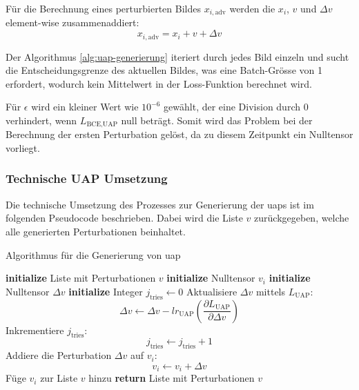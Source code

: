 Für die Berechnung eines perturbierten Bildes $x_{i,\text{adv}}$ werden die $x_i$, $v$ und $\Delta v$ element-wise zusammenaddiert: 
$$x_{i,\text{adv}} = x_i + v + \Delta v$$

Der Algorithmus \ref{alg:uap-generierung} iteriert durch jedes Bild einzeln und sucht die Entscheidungsgrenze des aktuellen Bildes, was eine Batch-Grösse von 1 erfordert, wodurch kein Mittelwert in der Loss-Funktion berechnet wird.

Für $\epsilon$ wird ein kleiner Wert wie $10^{-6}$ gewählt, der eine Division durch 0 verhindert, wenn $L_{\text{BCE,UAP}}$ null beträgt. Somit wird das Problem bei der Berechnung der ersten Perturbation gelöst, da zu diesem Zeitpunkt ein Nulltensor vorliegt. 

\newpage
\subsubsection{Technische UAP Umsetzung} \label{chap:technische_umsetzung_uap}


Die technische Umsetzung des Prozesses zur Generierung der \acrshort{uap}s ist im folgenden Pseudocode beschrieben. Dabei wird die Liste $v$ zurückgegeben, welche alle generierten Perturbationen beinhaltet.

\begin{algorithm}[H]
\caption{Algorithmus für die Generierung von \acrlong{uap}}
\begin{algorithmic}[1]
\label{algo:UAP Algorithmus}
\STATE \textbf{initialize} Liste mit Perturbationen $v$
    \STATE \textbf{initialize} Nulltensor $v_i$
        \STATE \textbf{initialize} Nulltensor $\Delta v$
        \STATE \textbf{initialize} Integer $j_{\text{tries}} \gets 0$
            \STATE Aktualisiere $\Delta v$ mittels $L_{\text{UAP}}$: $$\Delta v \gets \Delta v - lr_{\text{UAP}} (\frac{\partial L_{\text{UAP}}}{\partial \Delta v})$$
            \STATE Inkrementiere $j_{\text{tries}}$: $$j_{\text{tries}} \gets j_{\text{tries}} + 1$$
            \ENDWHILE
            \STATE Addiere die Perturbation $\Delta v$ auf $v_i$: $$v_i \leftarrow v_i + \Delta v$$
        \ENDFOR
    \ENDWHILE
    \STATE Füge $v_i$ zur Liste $v$ hinzu
\ENDFOR
\STATE \textbf{return} Liste mit Perturbationen $v$
\end{algorithmic}
\label{alg:uap-generierung}
\end{algorithm}

